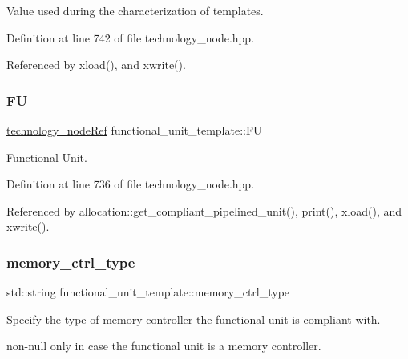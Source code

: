 Value used during the characterization of templates. 



Definition at line 742 of file technology\+\_\+node.\+hpp.



Referenced by xload(), and xwrite().

\mbox{\label{structfunctional__unit__template_ac2c180f41cde737cf1d25137f826ffed}} 
\subsubsection{\texorpdfstring{FU}{FU}}
{\footnotesize\ttfamily \hyperlink{technology__node_8hpp_a33dd193b7bd6b987bf0d8a770a819fa7}{technology\+\_\+node\+Ref} functional\+\_\+unit\+\_\+template\+::\+FU}



Functional Unit. 



Definition at line 736 of file technology\+\_\+node.\+hpp.



Referenced by allocation\+::get\+\_\+compliant\+\_\+pipelined\+\_\+unit(), print(), xload(), and xwrite().

\mbox{\label{structfunctional__unit__template_a9a5def963728fa040c975edf41fca33d}} 
\subsubsection{\texorpdfstring{memory\+\_\+ctrl\+\_\+type}{memory\_ctrl\_type}}
{\footnotesize\ttfamily std\+::string functional\+\_\+unit\+\_\+template\+::memory\+\_\+ctrl\+\_\+type}



Specify the type of memory controller the functional unit is compliant with. 

non-\/null only in case the functional unit is a memory controller. 

